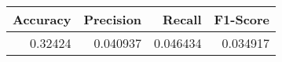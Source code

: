 \begin{tabular}{rrrr}
\toprule
 Accuracy &  Precision &   Recall &  F1-Score \\
\midrule
  0.32424 &   0.040937 & 0.046434 &  0.034917 \\
\bottomrule
\end{tabular}
